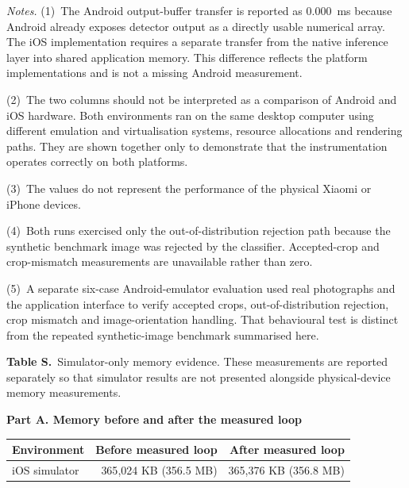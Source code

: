 \documentclass[preprint,12pt,authoryear]{elsarticle}
\newcommand{\tablehead}[2]{%
  \par\addvspace{\bigskipamount}%
  \needspace{12\baselineskip}%
  \refstepcounter{table}\label{#1}%
  {\footnotesize\noindent\textbf{Table \thetable.}~#2\par}%
  \nopagebreak\addvspace{4pt}\nopagebreak}
\newcommand{\tabletail}{\par\addvspace{\bigskipamount}}
\renewcommand{\thetable}{S\arabic{table}}
\begin{document}
{\footnotesize
\textit{Notes.}
(1)~The Android output-buffer transfer is reported as 0.000~ms because
Android already exposes detector output as a directly usable numerical array.
The iOS implementation requires a separate transfer from the native inference
layer into shared application memory. This difference reflects the platform
implementations and is not a missing Android measurement.

(2)~The two columns should not be interpreted as a comparison of Android and
iOS hardware. Both environments ran on the same desktop computer using
different emulation and virtualisation systems, resource allocations and
rendering paths. They are shown together only to demonstrate that the
instrumentation operates correctly on both platforms.

(3)~The values do not represent the performance of the physical Xiaomi or
iPhone devices.

(4)~Both runs exercised only the out-of-distribution rejection path because
the synthetic benchmark image was rejected by the classifier. Accepted-crop
and crop-mismatch measurements are unavailable rather than zero.

(5)~A separate six-case Android-emulator evaluation used real photographs and
the application interface to verify accepted crops, out-of-distribution
rejection, crop mismatch and image-orientation handling. That behavioural
test is distinct from the repeated synthetic-image benchmark summarised here.
\par}

\tabletail

\tablehead{tab:S2}{Simulator-only memory evidence. These measurements are
reported separately so that simulator results are not presented alongside
physical-device memory measurements.}

\noindent\textbf{Part A. Memory before and after the measured loop}

\begin{center}
\footnotesize
\setlength{\tabcolsep}{5pt}
\begin{tabular}{p{150pt} r r}
\toprule
Environment & Before measured loop & After measured loop \\
\midrule
iOS simulator & 365{,}024 KB (356.5 MB) & 365{,}376 KB (356.8 MB) \\
\bottomrule
\end{tabular}
\end{center}

\medskip
\end{document}
